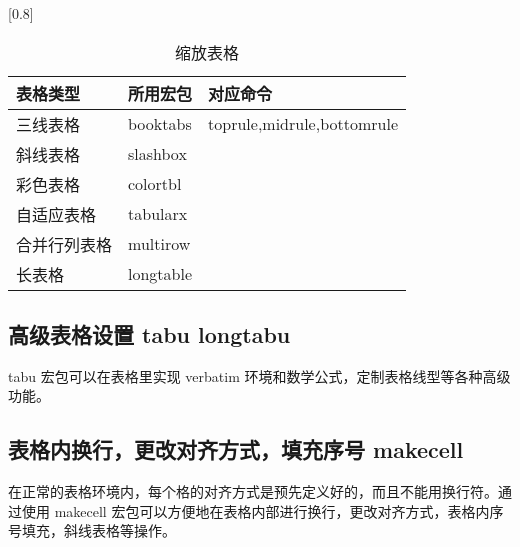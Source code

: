 \begin{table}[htbp]
  \centering
  \caption{缩放表格}\label{table_scale}
  \scalebox{1.25}[0.8]{
  \begin{tabular}{lll}
    \toprule
    表格类型 & 所用宏包 & 对应命令\\
    \midrule
    三线表格 & booktabs  & toprule,midrule,bottomrule \\
    斜线表格 & slashbox \\
    彩色表格 & colortbl \\
    自适应表格 & tabularx\\
    合并行列表格 & multirow \\
    长表格& longtable \\
    \bottomrule
  \end{tabular}
  }
\end{table}

\subsection{高级表格设置 tabu longtabu}
tabu 宏包可以在表格里实现 verbatim 环境和数学公式，定制表格线型等各种高级功能。
\begin{center}
\end{center}


\subsection{表格内换行，更改对齐方式，填充序号 makecell}
 
 在正常的表格环境内，每个格的对齐方式是预先定义好的，而且不能用换行符。通过使用 makecell 宏包可以方便地在表格内部进行换行，更改对齐方式，表格内序号填充，斜线表格等操作。

